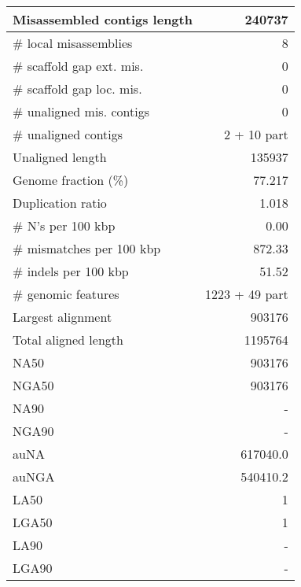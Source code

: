 \documentclass[12pt,a4paper]{article}
\begin{document}
\begin{table}[ht]
\begin{center}
\begin{tabular}{|l*{1}{|r}|}
Misassembled contigs length & 240737 \\ \hline
\# local misassemblies & 8 \\ \hline
\# scaffold gap ext. mis. & 0 \\ \hline
\# scaffold gap loc. mis. & 0 \\ \hline
\# unaligned mis. contigs & 0 \\ \hline
\# unaligned contigs & 2 + 10 part \\ \hline
Unaligned length & 135937 \\ \hline
Genome fraction (\%) & 77.217 \\ \hline
Duplication ratio & 1.018 \\ \hline
\# N's per 100 kbp & 0.00 \\ \hline
\# mismatches per 100 kbp & 872.33 \\ \hline
\# indels per 100 kbp & 51.52 \\ \hline
\# genomic features & 1223 + 49 part \\ \hline
Largest alignment & 903176 \\ \hline
Total aligned length & 1195764 \\ \hline
NA50 & 903176 \\ \hline
NGA50 & 903176 \\ \hline
NA90 & - \\ \hline
NGA90 & - \\ \hline
auNA & 617040.0 \\ \hline
auNGA & 540410.2 \\ \hline
LA50 & 1 \\ \hline
LGA50 & 1 \\ \hline
LA90 & - \\ \hline
LGA90 & - \\ \hline
\end{tabular}
\end{center}
\end{table}
\end{document}
